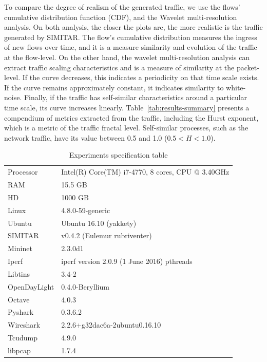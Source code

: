 To compare the degree of realism of the generated traffic, we use the flows' cumulative distribution function (CDF)\cite{harpoon-validation}, and the Wavelet multi-resolution analysis\cite{swing-paper}. On both analysis, the closer the plots are, the more realistic is the traffic generated by SIMITAR. The flow’s cumulative distribution measures the ingress of new flows over time, and it is a measure similarity and evolution of the traffic at the flow-level. On the other hand, the wavelet multi-resolution analysis can extract traffic scaling characteristics and is a measure of similarity at the packet-level. If the curve decreases, this indicates a periodicity on that time scale exists. If the curve remains approximately constant, it indicates similarity to white-noise. Finally, if the traffic has self-similar characteristics around a particular time scale, its curve increases linearly. Table~\ref{tab:results-summary} presents a compendium of metrics extracted from the traffic, including the Hurst exponent, which is a metric of the traffic fractal level. Self-similar  processes, such as the network traffic, have its value between 0.5  and 1.0 ($0.5 < H < 1.0 $)\cite{selfsimilar-ethernet}.


\begin{table}[!ht]
    \centering
    \caption{Experiments specification table}
    \label{tab:specifications}
    \begin{tabular}{ll}
        \hline
        Processor            & Intel(R) Core(TM) i7-4770, 8 cores, CPU @ 3.40GHz \\
        RAM                  & 15.5 GB                                           \\
        HD                   & 1000 GB                                           \\
        Linux         & 4.8.0-59-generic                                  \\
        Ubuntu        & Ubuntu 16.10 (yakkety)                            \\
        SIMITAR       & v0.4.2 (Eulemur rubriventer)                      \\
        Mininet       & 2.3.0d1                                           \\
        Iperf         & iperf version 2.0.9 (1 June 2016) pthreads        \\
        Libtins       & 3.4-2                                             \\
        OpenDayLight  & 0.4.0-Beryllium                                   \\
        Octave        & 4.0.3                                             \\
        Pyshark       & 0.3.6.2                                     \\
        Wireshark     & 2.2.6+g32dac6a-2ubuntu0.16.10               \\
        Tcudump       & 4.9.0 \\
        libpcap       & 1.7.4\\
        \hline
    \end{tabular}
\end{table}

